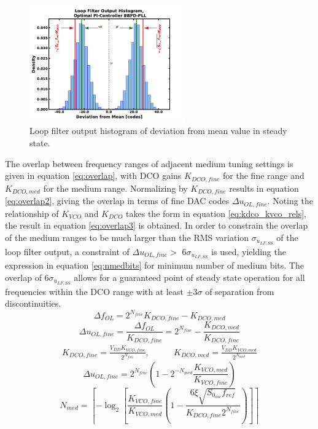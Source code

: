 			\begin{figure}[htb!]
			        \centering
			        \includegraphics[width=0.6\textwidth, angle=0]{./figs/design/lf_out_hist}
			    \caption{Loop filter output histogram of deviation from mean value in steady state.}
			    \label{fig:lf_out_hist}
			\end{figure}
	The overlap between frequency ranges of adjacent medium tuning settings is given in equation \ref{eq:overlap}, with DCO gains $K_{DCO,fine}$ for the fine range and  $K_{DCO,med}$ for the medium range. Normalizing by $K_{DCO,fine}$ results in equation \ref{eq:overlap2}, giving the overlap in terms of fine DAC codes $\Delta u_{OL,fine}$. Noting the relationship of $K_{VCO}$ and $K_{DCO}$ takes the form in equation \ref{eq:kdco_kvco_rels}, the result in equation \ref{eq:overlap3} is obtained. In order to constrain the overlap of the medium ranges to be much larger than the RMS variation $\sigma_{u_{LF,SS}}$ of the loop filter output, a constraint of $\Delta u_{OL,fine} >$ $6 \sigma_{u_{LF,SS}}$ is used, yielding the expression in equation \ref{eq:nmedbits} for minimum number of medium bits. The overlap of $6 \sigma_{u_{LF,SS}}$ allows for a guaranteed point of steady state operation for all frequencies within the DCO range with at least $\pm 3\sigma$ of separation from discontinuities.
	\begin{equation}\label{eq:overlap}
		\Delta f_{OL} = 2^{N_{fine}}K_{DCO,fine} - K_{DCO,med}
	\end{equation}
	\begin{equation}\label{eq:overlap2}
		\Delta u_{OL,fine} =\frac{\Delta f_{OL}}{K_{DCO,fine}} = 2^{N_{fine}} - \frac{K_{DCO,med}}{K_{DCO,fine}}
	\end{equation}
	\begin{align}\label{eq:kdco_kvco_rels}
		K_{DCO, fine} = \frac{V_{DD}K_{VCO,fine}}{2^{N_{fine}}}, \hspace{2em}& K_{DCO,med} = \frac{V_{DD}K_{VCO,med}}{2^{N_{med}}}
	\end{align}
	\begin{equation}\label{eq:overlap3}
		\Delta u_{OL,fine} = 2^{N_{fine}}\left(1 - 2^{-N_{med}}\frac{K_{VCO,med}}{K_{VCO,fine}}\right)
	\end{equation}
	\begin{equation}\label{eq:nmedbits}
		N_{med} = \left\lceil-\log_2\left[\frac{K_{VCO,fine}}{K_{VCO,med}} \left(1 - \frac{6\xi\sqrt{S_{0_{osc}}f_{ref}}}{K_{DCO,fine}2^{N_{fine}}}\right)\right] \right\rceil
	\end{equation}

